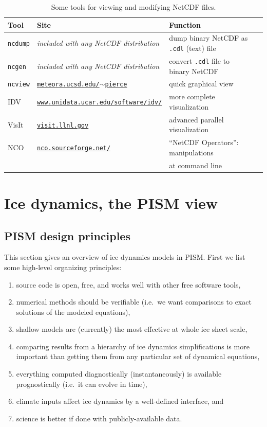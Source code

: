 \documentclass[11pt,final]{amsart}
\renewcommand{\t}[1]{\texttt{#1}}
\begin{document}
\begin{table}[ht]
\caption{Some tools for viewing and modifying NetCDF files.}\label{tab:NetCDFview} 
\small
\begin{tabular}{@{}llll}\hline
\textbf{Tool} & \textbf{Site} & \textbf{Function}\\ \hline
\verb|ncdump| & \emph{included with any NetCDF distribution} & dump binary NetCDF as \texttt{.cdl} (text) file \\
\verb|ncgen| & \emph{included with any NetCDF distribution} & convert \texttt{.cdl} file to binary NetCDF \\
\verb|ncview|\index{ncview} & \href{http://meteora.ucsd.edu/~pierce/ncview_home_page.html}{\texttt{meteora.ucsd.edu/$\sim$pierce}} & quick graphical view \\
IDV & \href{http://www.unidata.ucar.edu/software/idv/}{\t{www.unidata.ucar.edu/software/idv/}} & more complete visualization \\
VisIt & \href{http://visit.llnl.gov}{\t{visit.llnl.gov}} & advanced parallel visualization \\
NCO\index{NCO (NetCDF Operators)} & \href{http://nco.sourceforge.net/}{\t{nco.sourceforge.net/}} & ``NetCDF Operators'': manipulations \\
\quad  & & \quad at command line
\end{tabular}
\normalsize
\end{table}



\clearpage
\newpage
\section{Ice dynamics, the PISM view}\label{sect:dynamics}

\subsection{PISM design principles}  This section gives an overview of ice dynamics models in PISM.  First we list some high-level organizing principles:
\begin{enumerate}
\item source code is open, free, and works well with other free software tools,
\item numerical methods should be verifiable (i.e.~we want comparisons to exact solutions of the modeled equations),
\item shallow models are (currently) the most effective at whole ice sheet scale,
\item comparing results from a hierarchy of ice dynamics simplifications is more important than getting them from any particular set of dynamical equations,
\item everything computed diagnostically (instantaneously) is available prognostically (i.e.~it can evolve in time),
\item climate inputs affect ice dynamics by a well-defined interface, and
\item science is better if done with publicly-available data.
\end{enumerate}
\end{document}
